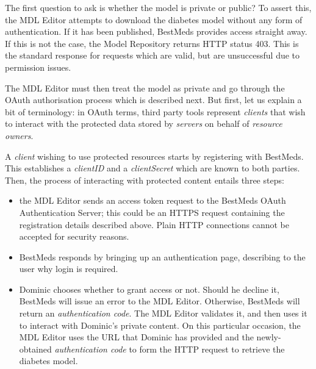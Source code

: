\begin{techNote}
The first question to ask is whether the model is private or public? To assert this, the MDL Editor attempts to download the diabetes model without any form of authentication. If it has been published, BestMeds provides access straight away. If this is not the case, the Model Repository returns HTTP status 403. This is the standard response for requests which are valid, but are unsuccessful due to permission issues. 

The MDL Editor must then treat the model as private and go through the OAuth authorisation process which is described next. But first, let us explain a bit of terminology: in OAuth terms, third party tools represent \emph{clients} that wish to interact with the protected data stored by \emph{servers} on behalf of \emph{resource owners}. 

A \emph{client} wishing to use protected resources starts by registering with BestMeds. This establishes a \emph{clientID} and a \emph{clientSecret} which are known to both parties. Then, the process of interacting with protected content entails three steps:

\begin{itemize}
\item the MDL Editor sends an access token request to the BestMeds OAuth Authentication Server; this could be an HTTPS request containing the registration details described above. Plain HTTP connections cannot be accepted for security reasons.
\item BestMeds responds by bringing up an authentication page, describing to the user why login is required.
\item Dominic chooses whether to grant access or not. Should he decline it, BestMeds will issue an error to the MDL Editor. Otherwise, BestMeds will return an \emph{authentication code}. The MDL Editor validates it, and then uses it to interact with Dominic's private content. On this particular occasion, the MDL Editor uses the URL that Dominic has provided and the newly-obtained \emph{authentication code} to form the HTTP request to retrieve the diabetes model.
\end{itemize}
\end{techNote}


%
